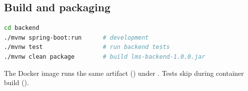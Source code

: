 \subsection{Build and packaging}

\begin{lstlisting}[language=bash,caption={Verified backend build and run commands (backend/pom.xml, README.md)}]
cd backend
./mvnw spring-boot:run      # development
./mvnw test                 # run backend tests
./mvnw clean package        # build lms-backend-1.0.0.jar
\end{lstlisting}

\noindent The Docker image runs the same artifact () under . Tests skip during container build ().
